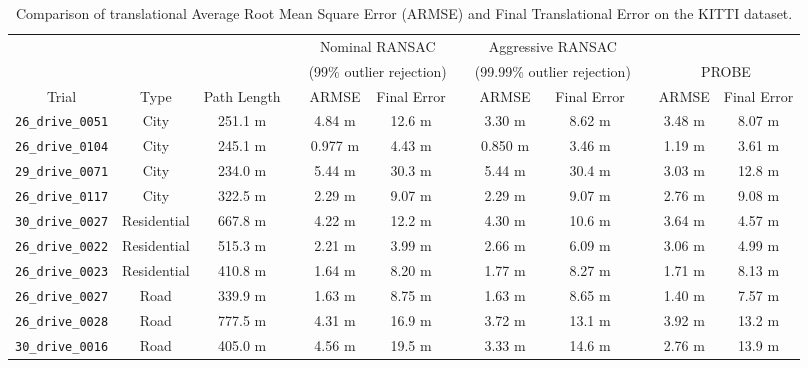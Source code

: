 \documentclass[letterpaper, 10 pt, conference]{ieeeconf}  %
\newcommand\T{\rule{0pt}{2.6ex}}        %
\newcommand\B{\rule[-1.2ex]{0pt}{0pt}} %
\begin{document}
\begin{table*}
    \centering
    \caption{Comparison of translational Average Root Mean Square Error (ARMSE) and Final Translational Error on the KITTI dataset.}

    \begin{threeparttable}
        \begin{tabular}{cccccccccccc}
        & & & & \multicolumn{2}{c}{Nominal RANSAC} & & \multicolumn{2}{c}{Aggressive RANSAC} & & &  \\
        	 & & & & \multicolumn{2}{c}{(99\% outlier rejection)} & & \multicolumn{2}{c}{(99.99\% outlier rejection)} & & \multicolumn{2}{c}{PROBE} \B \\
             \cline{5-6} \cline{8-9} \cline{11-12}
        	 Trial & Type & Path Length &&  ARMSE & Final Error & & ARMSE & Final Error & & ARMSE & Final Error \T\B \\ \hline \T
        	\texttt{26\_drive\_0051} & City \tnote{1} & 251.1 m && 4.84 m & 12.6 m && 3.30 m & 8.62 m && 3.48 m & 8.07 m \\
        	\texttt{26\_drive\_0104} & City \tnote{1} & 245.1 m && 0.977 m & 4.43 m && 0.850 m & 3.46 m && 1.19 m & 3.61 m \\ 
        	\texttt{29\_drive\_0071} & City \tnote{1} & 234.0 m && 5.44 m & 30.3 m && 5.44 m & 30.4 m && 3.03 m & 12.8 m \\ 
        		\texttt{26\_drive\_0117} & City \tnote{1} & 322.5 m && 2.29 m & 9.07 m && 2.29 m & 9.07 m && 2.76 m & 9.08 m \\ 
        		\texttt{30\_drive\_0027} & Residential \tnote{1, \dag} & 667.8 m && 4.22 m & 12.2 m && 4.30 m & 10.6 m && 3.64 m & 4.57 m \\ 
        		\texttt{26\_drive\_0022} & Residential \tnote{2} & 515.3 m && 2.21 m & 3.99 m && 2.66 m & 6.09 m && 3.06 m & 4.99 m \\ 
        		\texttt{26\_drive\_0023} & Residential \tnote{2} & 410.8 m && 1.64 m & 8.20 m && 1.77 m & 8.27 m && 1.71 m & 8.13 m \\ 
        		\texttt{26\_drive\_0027} & Road \tnote{3} & 339.9 m && 1.63 m & 8.75 m && 1.63 m & 8.65 m && 1.40 m & 7.57 m \\ 
        		\texttt{26\_drive\_0028} & Road \tnote{3} & 777.5 m && 4.31 m & 16.9 m && 3.72 m & 13.1 m && 3.92 m & 13.2 m \\ 
        		\texttt{30\_drive\_0016} & Road \tnote{3} & 405.0 m && 4.56 m & 19.5 m && 3.33 m & 14.6 m && 2.76 m & 13.9 m \\ 

\end{tabular}
\end{threeparttable}
\end{table*}
\end{document}
